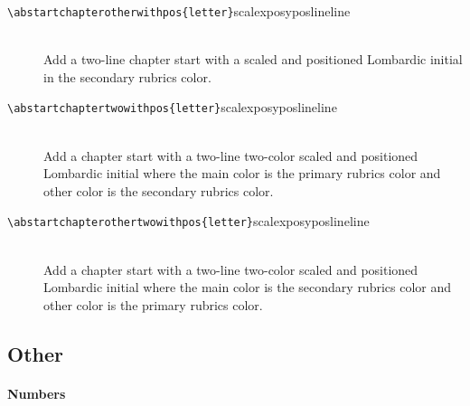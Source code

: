 \documentclass[a4paper]{article}
\newcommand{\ltxcmd}[2]{\texttt{\textbackslash{}#1\{#2\}}}
\begin{document}
\begin{description}
\item [\ltxcmd{abstartchapterotherwithpos}{letter}{scale}{xpos}{ypos}{line}{line}]
  \mbox{} \\
  Add a two-line chapter start with a scaled and positioned Lombardic
  initial in the secondary rubrics color. 

\item [\ltxcmd{abstartchaptertwowithpos}{letter}{scale}{xpos}{ypos}{line}{line}] \mbox{} \\
  Add a chapter start with a two-line two-color scaled and positioned
  Lombardic initial where the main color is the primary rubrics color
  and other color is the secondary rubrics color. 

\item [\ltxcmd{abstartchapterothertwowithpos}{letter}{scale}{xpos}{ypos}{line}{line}] \mbox{} \\ 
  Add a chapter start with a two-line two-color scaled and positioned
  Lombardic initial where the main color is the secondary rubrics color
  and other color is the primary rubrics color. 

\end{description}

\subsection{Other} 

\paragraph{Numbers}
\end{document}
